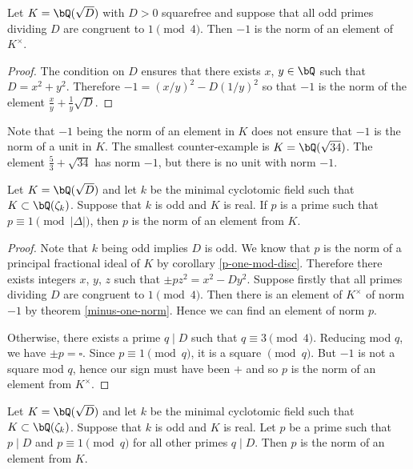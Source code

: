 \begin{thm}\label{minus-one-norm}
Let $K = \bQ(\sqrt{D})$ with $D >0$ squarefree and suppose that all odd primes dividing $D$ are congruent to $1 \pmod 4$. Then $-1$ is the norm of an element of $K^{\times}$. 
\end{thm}

\begin{proof}
The condition on $D$ ensures that there exists $x$, $y \in \bQ$ such that $D = x^2 + y^2$. Therefore $-1 = (x / y)^2 - D(1/ y)^2$ so that $-1$ is the norm of the element $\frac{x}{y} + \frac{1}{y} \sqrt{D}$.

\end{proof}

Note that $-1$ being the norm of an element in $K$ does not ensure that $-1$ is the norm of a unit in $K$. The smallest counter-example is $K = \bQ(\sqrt{34})$. The element $\frac{5}{3} + \sqrt{34}$ has norm $-1$, but there is no unit with norm $-1$. 

\begin{thm}\label{p-norm-elem-1}
    Let $K = \bQ(\sqrt{D})$ and let $k$ be the minimal cyclotomic field such that $K \subset \bQ(\zeta_k)$. Suppose that $k$ is odd and $K$ is real.  If $p$ is a prime such that $p \equiv 1 \pmod {|\Delta|}$, then $p$ is the norm of an element from $K$. 
\end{thm}

\begin{proof}
    Note that $k$ being odd implies $D$ is odd. We know that $p$ is the norm of a principal fractional ideal of $K$ by corollary \ref{p-one-mod-disc}. Therefore there exists integers $x$, $y$, $z$ such that $\pm p z^2 = x^2 - Dy^2$. Suppose firstly that all primes dividing $D$ are congruent to $1 \pmod 4$. Then there is an element of $K^{\times}$ of norm $-1$ by theorem \ref{minus-one-norm}. Hence we can find an element of norm $p$.

    Otherwise, there exists a prime $q \mid D$ such that $q \equiv 3 \pmod 4$. Reducing mod $q$, we have
    $ \pm p = \square$. Since $p \equiv 1 \pmod q$, it is a square $\pmod q$. But $-1$ is not a square mod $q$, hence our sign must have been $+$ and so $p$ is the norm of an element from $K^{\times}$.
\end{proof}

\begin{thm}\label{p-norm-elem-2}
    Let $K = \bQ(\sqrt{D})$ and let $k$ be the minimal cyclotomic field such that $K \subset \bQ(\zeta_k)$. Suppose that $k$ is odd and $K$ is real. Let $p$ be a prime such that $p \mid D$ and $p \equiv 1 \pmod q$ for all other primes $q \mid D$. Then $p$ is the norm of an element from $K$. 
\end{thm}

